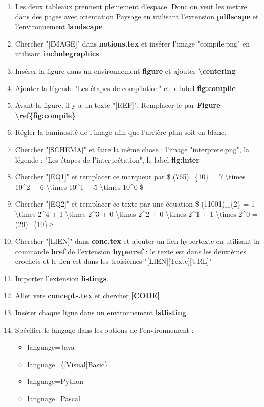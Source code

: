 \documentclass[11pt, a4paper]{article}
\begin{document}
\begin{enumerate}
	\item Les deux tableaux prennent pleinement d'espace. Donc on veut les mettre dans des pages avec orientation Paysage en utilisant l'extension \textbf{pdflscape} et l'environnement \textbf{landscape}
	\item Chercher "[IMAGE]" dans \textbf{notions.tex} et insérer l'image "compile.png" en utilisant \textbf{includegraphics}.
	\item Insérer la figure dans un environnement \textbf{figure} et ajouter \textbf{\textbackslash centering} 
	\item Ajouter la légende "Les étapes de compilation" et le label \textbf{fig:compile}
	\item Avant la figure, il y a un texte "[REF]". Remplacer le par \textbf{Figure \textbackslash ref\{fig:compile\}}
	\item Régler la luminosité de l'image afin que l'arrière plan soit en blanc.
	\item Chercher "[SCHEMA]" et faire la même chose : l'image "interprete.png", la légende : "Les étapes de l'interprétation", le label \textbf{fig:inter}
	\item Chercher "[EQ1]" et remplacer ce marqueur par \$ (765)\_\{10\} = 7 \textbackslash times 10\textasciicircum 2 + 6 \textbackslash times 10\textasciicircum 1 + 5 \textbackslash times 10\textasciicircum 0 \$
	\item Chercher "[EQ2]" et remplacer ce texte par une équation \$ (11001)\_\{2\} = 1 \textbackslash times 2\textasciicircum 4 + 1 \textbackslash times 2\textasciicircum 3 + 0 \textbackslash times 2\textasciicircum 2 + 0 \textbackslash times 2\textasciicircum 1 + 1 \textbackslash times 2\textasciicircum 0 = (29)\_\{10\} \$
	\item  Chercher "[LIEN]" dans \textbf{conc.tex} et ajouter un lien hypertexte en utilisant la commande \textbf{href} de l'extension \textbf{hyperref} : le texte est dans les deuxièmes crochets et le lien est dans les troisièmes "[LIEN][Texte][URL]"
	
	\item Importer l'extension \textbf{listings}. 
	\item Aller vers \textbf{concepts.tex} et chercher \textbf{[CODE]}
	\item Insérer chaque ligne dans un environnement \textbf{lstlisting}. 
	\item Spécifier le langage dans les options de l'environnement : 
	\begin{itemize}
		\item language=Java
		\item language=\{[Visual]Basic\}
		\item language=Python
		\item language=Pascal
	\end{itemize}
	
\end{enumerate}
\end{document}
